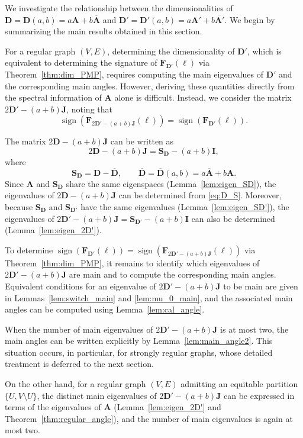 \documentclass[a4paper, 11pt]{article}
\newcommand{\A}{\boldsymbol{A}}
\newcommand{\J}{\boldsymbol{J}}
\newcommand{\I}{\boldsymbol{I}}
\newcommand{\D}{\boldsymbol{D}}
\newcommand{\F}{\boldsymbol{F}}
\newcommand{\Sm}{\boldsymbol{S}}
\theoremstyle{definition}
\begin{document}
We investigate the relationship between the dimensionalities of
$\D=\D(a,b)=a\A+b\overline{\A}$ and
$\D'=\D'(a,b)=a\A'+b\overline{\A'}$.
We begin by summarizing the main results obtained in this section.

For a regular graph $(V,E)$, determining the dimensionality of $\D'$,
which is equivalent to determining the signature of $\F_{\D'}(\ell)$
via Theorem~\ref{thm:dim_PMP},
requires computing the main eigenvalues of $\D'$ and the corresponding
main angles. 
However, deriving these quantities directly from the spectral information
of $\A$ alone is difficult.
Instead, we consider the matrix $2\D'-(a+b)\J$, noting that
\[
\operatorname{sign}(\F_{2\D'-(a+b)\J}(\ell))
=
\operatorname{sign}(\F_{\D'}(\ell)).
\]

The matrix $2\D-(a+b)\J$ can be written as
\begin{equation}\label{eq:D_S}
2\D-(a+b)\J=\Sm_{\D}-(a+b)\I,
\end{equation}
where
\[
\Sm_{\D}=\D-\overline{\D}, 
\qquad  
\overline{\D}=\overline{\D}(a,b)=a\overline{\A}+b\A.
\]
Since $\A$ and $\Sm_{\D}$ share the same eigenspaces
(Lemma~\ref{lem:eigen_SD}),
the eigenvalues of $2\D-(a+b)\J$ can be determined from
\eqref{eq:D_S}.
Moreover, because $\Sm_{\D}$ and $\Sm_{\D'}$ have the same eigenvalues
(Lemma~\ref{lem:eigen_SD'}),
the eigenvalues of
$2\D'-(a+b)\J=\Sm_{\D'}-(a+b)\I$
can also be determined
(Lemma~\ref{lem:eigen_2D'}).

To determine
$\operatorname{sign}(\F_{\D'}(\ell))
=
\operatorname{sign}(\F_{2\D'-(a+b)\J}(\ell))$
via Theorem~\ref{thm:dim_PMP},
it remains to identify which eigenvalues of
$2\D'-(a+b)\J$ are main and to compute the corresponding main angles.
Equivalent conditions for an eigenvalue of
$2\D'-(a+b)\J$ to be main are given in
Lemmas~\ref{lem:switch_main} and \ref{lem:mu_0_main},
and the associated main angles can be computed using
Lemma~\ref{lem:cal_angle}.

When the number of main eigenvalues of $2\D'-(a+b)\J$ is at most two,
the main angles can be written explicitly by
Lemma~\ref{lem:main_angle2}.
This situation occurs, in particular, for strongly regular graphs,
whose detailed treatment is deferred to the next section.

On the other hand, for a regular graph $(V,E)$ admitting an equitable
partition $\{U,V\setminus U\}$,
the distinct main eigenvalues of $2\D'-(a+b)\J$
can be expressed in terms of the eigenvalues of $\A$
(Lemma~\ref{lem:eigen_2D'} and Theorem~\ref{thm:regular_angle}),
and the number of main eigenvalues is again at most two.
\end{document}
